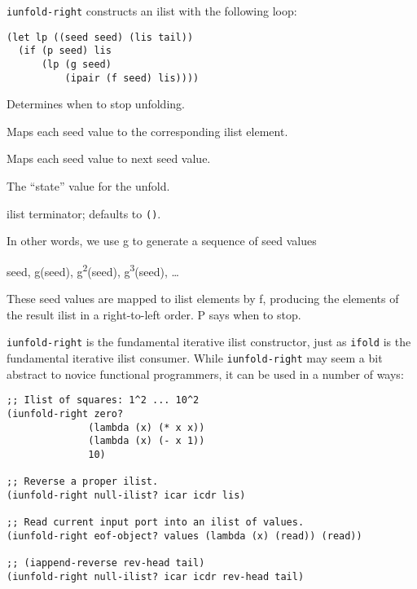 \begin{entry}{%
  }

\texttt{iunfold-right} constructs an ilist with the
  following loop:

\begin{verbatim}
(let lp ((seed seed) (lis tail))
  (if (p seed) lis
      (lp (g seed)
          (ipair (f seed) lis))))
\end{verbatim}

\begin{description}
  \tightlist
\item[ p ] Determines when to stop unfolding.
\item[ f ] Maps each seed value to the corresponding ilist element.
\item[ g ] Maps each seed value to next seed value.
\item[ seed ] The ``state'' value for the unfold.
\item[ tail ] ilist terminator; defaults to
  \texttt{\textquotesingle{}()}.
\end{description}

In other words, we use g to generate a sequence of seed values

seed, g(seed), g\textsuperscript{2}(seed), g\textsuperscript{3}(seed),
\ldots{}

These seed values are mapped to ilist elements by f, producing the
elements of the result ilist in a right-to-left order. P says when to
stop.

\texttt{iunfold-right} is the fundamental iterative ilist constructor,
just as \texttt{ifold} is the fundamental iterative ilist consumer.
While \texttt{iunfold-right} may seem a bit abstract to novice
functional programmers, it can be used in a number of ways:

\begin{verbatim}
;; Ilist of squares: 1^2 ... 10^2
(iunfold-right zero? 
              (lambda (x) (* x x))
              (lambda (x) (- x 1))
              10)
    
;; Reverse a proper ilist.
(iunfold-right null-ilist? icar icdr lis)

;; Read current input port into an ilist of values.
(iunfold-right eof-object? values (lambda (x) (read)) (read))

;; (iappend-reverse rev-head tail)
(iunfold-right null-ilist? icar icdr rev-head tail)
\end{verbatim}


\end{entry}
